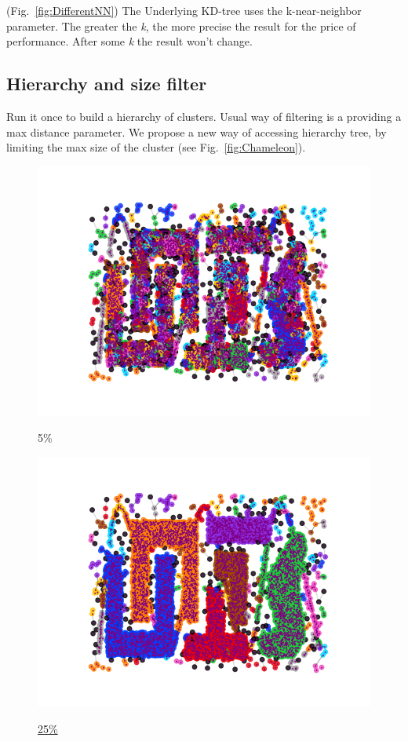 \documentclass[12pt, a4paper, twocolumn]{article}
\newcommand{\githubPics}{https://raw.githubusercontent.com/artamono1/druhg/master/papers/druhg/}
\begin{document}
(Fig.~\ref{fig:DifferentNN}) The Underlying KD-tree uses the k-near-neighbor parameter. The greater the \textit{k}, the more precise the result for the price of performance. 
After some \textit{k} the result won't change.


\subsection{Hierarchy and size filter}

Run it once to build a hierarchy of clusters. 
Usual way of filtering is a providing a max distance parameter. We propose a new way of accessing hierarchy tree, by limiting the max size of the cluster (see Fig.~\ref{fig:Chameleon}).

\begin{figure}[!htb]
  \begin{minipage}[c]{0.40\linewidth}
    \href{\githubPics run_chameleon05.png}{\includegraphics[width=\linewidth]{run_chameleon05.png}}\caption*{5\%}
  \end{minipage}
  \begin{minipage}[c]{0.40\linewidth}
    \href{\githubPics run_chameleon25.png}{\includegraphics[width=\linewidth]{run_chameleon25.png}}\caption*{\underline{25\%}}

\end{minipage}
\end{figure}
\end{document}
